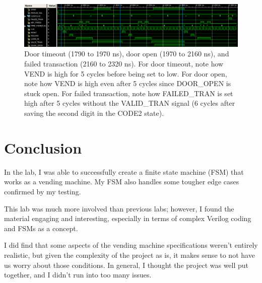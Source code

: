 \documentclass{article}
\begin{document}
\begin{figure}[H]
    \centering
    \includegraphics[scale=0.35]{../figs/sim6_7_8.png}
    \caption{Door timeout (1790 to 1970 ns), door open (1970 to 2160 ns), and failed transaction (2160 to 2320 ns). For door timeout, note how VEND is high for 5 cycles before being set to low. For door open, note how VEND is high even after 5 cycles since DOOR\_OPEN is stuck open. For failed transaction, note how FAILED\_TRAN is set high after 5 cycles without the VALID\_TRAN signal (6 cycles after saving the second digit in the CODE2 state).}
    \label{fig:sim6_7_8}
\end{figure}

\section{Conclusion}
In the lab, I was able to successfully create a finite state machine (FSM) that works as a vending machine. My FSM also handles some tougher edge cases confirmed by my testing. 

This lab was much more involved than previous labs; however, I found the material engaging and interesting, especially in terms of complex Verilog coding and FSMs as a concept.

I did find that some aspects of the vending machine specifications weren't entirely realistic, but given the complexity of the project as is, it makes sense to not have us worry about those conditions. In general, I thought the project was well put together, and I didn't run into too many issues.
\end{document}
